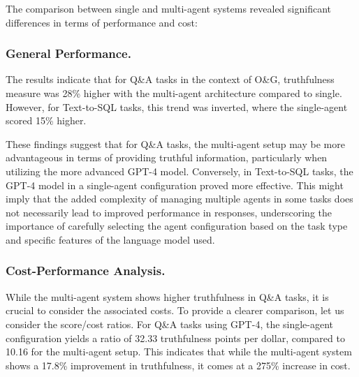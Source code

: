             
            The comparison between single and multi-agent systems revealed significant differences in terms of performance and cost:
            
            \subsubsection{General Performance.}     
                The results indicate that for Q\&A tasks in the context of O\&G, truthfulness measure was 28\% higher with the multi-agent architecture compared to single. 
                However, for Text-to-SQL tasks, this trend was inverted, where the single-agent scored 15\% higher.

                These findings suggest that for Q\&A tasks, the multi-agent setup may be more advantageous in terms of providing truthful information, particularly when utilizing the more advanced GPT-4 model. 
                Conversely, in Text-to-SQL tasks, the GPT-4 model in a single-agent configuration proved more effective. 
                This might imply that the added complexity of managing multiple agents in some tasks does not necessarily lead to improved performance in responses, underscoring the importance of carefully selecting the agent configuration based on the task type and specific features of the language model used.
                    
            \subsubsection{Cost-Performance Analysis.}
                While the multi-agent system shows higher truthfulness in Q\&A tasks, it is crucial to consider the associated costs. 
                To provide a clearer comparison, let us consider the score/cost ratios. For Q\&A tasks using GPT-4, the single-agent configuration yields a ratio of 32.33 truthfulness points per dollar, compared to 10.16 for the multi-agent setup. This indicates that while the multi-agent system shows a 17.8\% improvement in truthfulness, it comes at a 275\% increase in cost.
                

